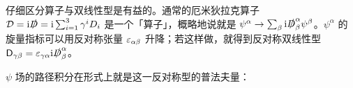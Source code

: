 仔细区分算子与双线性型是有益的。通常的厄米狄拉克算子 ${\mathcal D}={\mathrm i}\slashed{D}={\mathrm i}\sum_{i=1}^3{\gamma}^iD_i$ 是一个「算子」，概略地说就是 $\psi^\alpha\to \sum_\beta{\mathrm i}\slashed{D}^\alpha_\beta\psi^\beta$。$\psi^\alpha$ 的旋量指标可以用反对称张量 $\varepsilon_{\alpha\beta}$ 升降；若这样做，就得到反对称双线性型 ${\sf D}_{\gamma\beta}=\varepsilon_{\gamma\alpha}{\mathrm i}\slashed{D}^\alpha_\beta$。


$\psi$ 场的路径积分在形式上就是这一反对称型的普法夫量：
